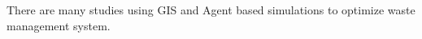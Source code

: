 \documentclass{scsSimAUDPaperFormat}
\begin{document}
There are many studies using GIS and Agent based simulations to optimize waste management system.



\end{document}
